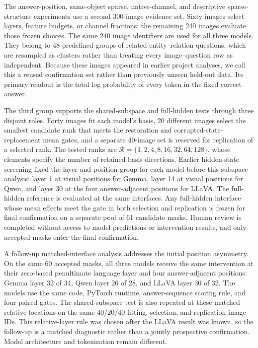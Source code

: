 The answer-position, same-object sparse, native-channel, and descriptive sparse-structure experiments use a second 300-image evidence set. Sixty images select layers, feature budgets, or channel fractions; the remaining 240 images evaluate those frozen choices. The same 240 image identifiers are used for all three models. They belong to 48 predefined groups of related entity--relation questions, which are resampled as clusters rather than treating every image--question row as independent. Because these images appeared in earlier project analyses, we call this a reused confirmation set rather than previously unseen held-out data. Its primary readout is the total log probability of every token in the fixed correct answer.

The third group supports the shared-subspace and full-hidden tests through three disjoint roles. Forty images fit each model's basis, 20 different images select the smallest candidate rank that meets the restoration and corrupted-state-replacement mean gates, and a separate 40-image set is reserved for replication of a selected rank. The tested ranks are $\mathcal{R}=\{1,2,4,8,16,32,64,128\}$, whose elements specify the number of retained basis directions. Earlier hidden-state screening fixed the layer and position group for each model before this subspace analysis: layer 1 at visual positions for Gemma, layer 14 at visual positions for Qwen, and layer 30 at the four answer-adjacent positions for LLaVA. The full-hidden reference is evaluated at the same interfaces. Any full-hidden interface whose mean effects meet the gate in both selection and replication is frozen for final confirmation on a separate pool of 61 candidate masks. Human review is completed without access to model predictions or intervention results, and only accepted masks enter the final confirmation.

A follow-up matched-interface analysis addresses the initial position asymmetry. On the same 60 accepted masks, all three models receive the same intervention at their zero-based penultimate language layer and four answer-adjacent positions: Gemma layer 32 of 34, Qwen layer 26 of 28, and LLaVA layer 30 of 32. The models use the same code, PyTorch runtime, answer-sequence scoring rule, and four paired gates. The shared-subspace test is also repeated at these matched relative locations on the same 40/20/40 fitting, selection, and replication image IDs. This relative-layer rule was chosen after the LLaVA result was known, so the follow-up is a matched diagnostic rather than a jointly prospective confirmation. Model architecture and tokenization remain different.

